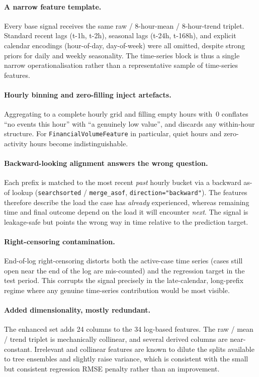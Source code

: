 \documentclass[runningheads]{llncs}
\begin{document}
\paragraph{A narrow feature template.}
Every base signal receives the same raw / 8-hour-mean / 8-hour-trend triplet.
Standard recent lags (t-1h, t-2h), seasonal lags (t-24h, t-168h), and explicit
calendar encodings (hour-of-day, day-of-week) were all omitted, despite strong
priors for daily and weekly seasonality. The time-series block is thus a single
narrow operationalisation rather than a representative sample of time-series
features.

\paragraph{Hourly binning and zero-filling inject artefacts.}
Aggregating to a complete hourly grid and filling empty hours with~0 conflates
``no events this hour'' with ``a genuinely low value'', and discards any
within-hour structure. For \texttt{FinancialVolumeFeature} in particular, quiet
hours and zero-activity hours become indistinguishable.

\paragraph{Backward-looking alignment answers the wrong question.}
Each prefix is matched to the most recent \emph{past} hourly bucket via a
backward as-of lookup (\texttt{searchsorted} / \texttt{merge\_asof},
\texttt{direction="backward"}). The features therefore describe the load the
case has \emph{already} experienced, whereas remaining time and final outcome
depend on the load it will encounter \emph{next}. The signal is leakage-safe
but points the wrong way in time relative to the prediction target.

\paragraph{Right-censoring contamination.}
End-of-log right-censoring distorts both the active-case time series (cases
still open near the end of the log are mis-counted) and the regression target
in the test period. This corrupts the signal precisely in the late-calendar,
long-prefix regime where any genuine time-series contribution would be most
visible.

\paragraph{Added dimensionality, mostly redundant.}
The enhanced set adds 24 columns to the 34 log-based features. The raw / mean /
trend triplet is mechanically collinear, and several derived columns are
near-constant. Irrelevant and collinear features are known to dilute the splits
available to tree ensembles and slightly raise variance, which is consistent
with the small but consistent regression RMSE penalty rather than an
improvement.
\end{document}
